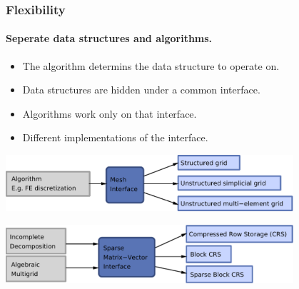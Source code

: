 \documentclass[aspectratio=169,11pt]{beamer}
\theoremstyle{definition}
\begin{document}




\begin{frame} \frametitle{Flexibility}

  \framesubtitle<presentation>{Seperate data structures and algorithms.}


  \begin{itemize}
  \item The algorithm determins the data structure to
    operate on.
  \item Data structures are hidden under a common interface.
  \item Algorithms work only on that interface.
  \item Different implementations of the interface.
  \end{itemize} \centerline{\includegraphics[width=0.8\textwidth]{abstractalgorithm}}
  \medskip
  \centerline{\includegraphics[width=0.8\textwidth]{abstractmatvec}}
\end{frame}
\end{document}
